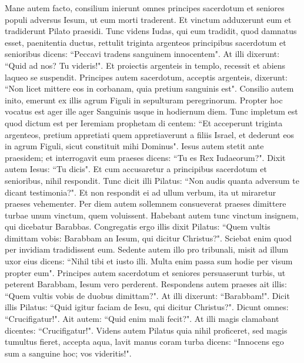 \begin{biblechapter}  
\verse Mane autem facto, consilium inierunt omnes principes sacerdotum et seniores populi adversus Iesum, ut eum morti traderent. 
\verse Et vinctum adduxerunt eum et tradiderunt Pilato praesidi. 
\verse Tunc videns Iudas, qui eum tradidit, quod damnatus esset, paenitentia ductus, rettulit triginta argenteos principibus sacerdotum et senioribus 
\verse dicens: “Peccavi tradens sanguinem innocentem". At illi dixerunt: “Quid ad nos? Tu videris!". 
\verse Et proiectis argenteis in templo, recessit et abiens laqueo se suspendit. 
\verse Principes autem sacerdotum, acceptis argenteis, dixerunt: “Non licet mittere eos in corbanam, quia pretium sanguinis est". 
\verse Consilio autem inito, emerunt ex illis agrum Figuli in sepulturam peregrinorum. 
\verse Propter hoc vocatus est ager ille ager Sanguinis usque in hodiernum diem. 
\verse Tunc impletum est quod dictum est per Ieremiam prophetam di centem: “Et acceperunt triginta argenteos, pretium appretiati quem appretiaverunt a filiis Israel, 
\verse et dederunt eos in agrum Figuli, sicut constituit mihi Dominus". 
\verse Iesus autem stetit ante praesidem; et interrogavit eum praeses dicens: “Tu es Rex Iudaeorum?". Dixit autem Iesus: “Tu dicis". 
\verse Et cum accusaretur a principibus sacerdotum et senioribus, nihil respondit. 
\verse Tunc dicit illi Pilatus: “Non audis quanta adversum te dicant testimonia?". 
\verse Et non respondit ei ad ullum verbum, ita ut miraretur praeses vehementer. 
\verse Per diem autem sollemnem consueverat praeses dimittere turbae unum vinctum, quem voluissent. 
\verse Habebant autem tunc vinctum insignem, qui dicebatur Barabbas. 
\verse Congregatis ergo illis dixit Pilatus: “Quem vultis dimittam vobis: Barabbam an Iesum, qui dicitur Christus?". 
\verse Sciebat enim quod per invidiam tradidissent eum. 
\verse Sedente autem illo pro tribunali, misit ad illum uxor eius dicens: “Nihil tibi et iusto illi. Multa enim passa sum hodie per visum propter eum". 
\verse Principes autem sacerdotum et seniores persuaserunt turbis, ut peterent Barabbam, Iesum vero perderent. 
\verse Respondens autem praeses ait illis: “Quem vultis vobis de duobus dimittam?". At illi dixerunt: “Barabbam!". 
\verse Dicit illis Pilatus: “Quid igitur faciam de Iesu, qui dicitur Christus?". Dicunt omnes: “Crucifigatur!". 
\verse Ait autem: “Quid enim mali fecit?". At illi magis clamabant dicentes: “Crucifigatur!". 
\verse Videns autem Pilatus quia nihil proficeret, sed magis tumultus fieret, accepta aqua, lavit manus coram turba dicens: “Innocens ego sum a sanguine hoc; vos videritis!". 

\end{biblechapter}
